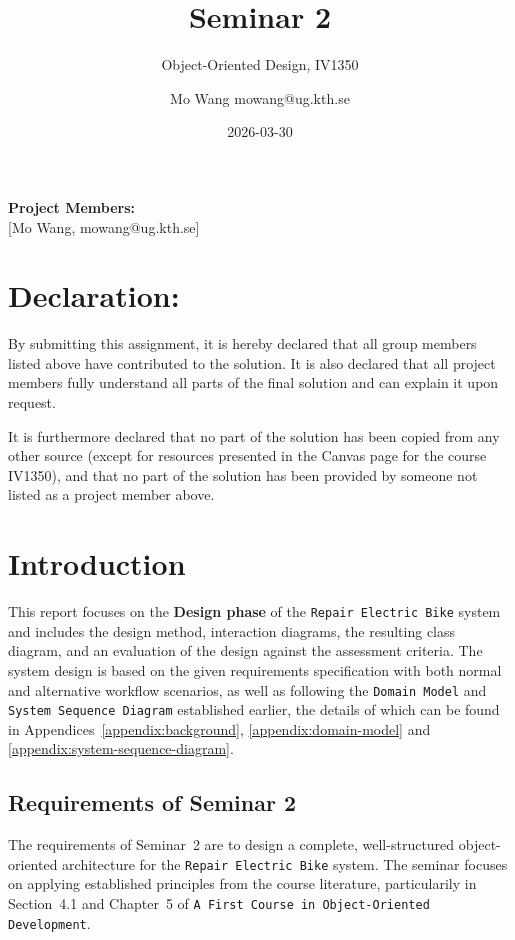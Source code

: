 \documentclass[a4paper]{scrartcl}
\title{Seminar 2}
\subtitle{Object-Oriented Design, IV1350}
\author{Mo Wang mowang@ug.kth.se}
\date{2026-03-30}
\begin{document}
\maketitle
\noindent\textbf{Project Members:} \\ \hfill
[Mo Wang, mowang@ug.kth.se]

\section*{Declaration:}

By submitting this assignment, it is hereby declared that all group members listed above have contributed to the solution. It is also declared that all project members fully understand all parts of the final solution and can explain it upon request.

It is furthermore declared that no part of the solution has been copied from any other source (except for resources presented in the Canvas page for the course IV1350), and that no part of the solution has been provided by someone not listed as a project member above.

\section{Introduction}
\label{sec:intro}


This report focuses on the \textbf{Design phase} of the \texttt{Repair Electric Bike} system and includes the design method, interaction diagrams, the resulting class diagram, and an evaluation of the design against the assessment criteria. The system design is based on the given requirements specification with both normal and alternative workflow scenarios, as well as following the \texttt{Domain Model} and \texttt{System Sequence Diagram} established earlier, the details of which can be found in Appendices~\ref{appendix:background}, \ref{appendix:domain-model} and \ref{appendix:system-sequence-diagram}.

\subsection{Requirements of Seminar 2}
The requirements of Seminar~2 are to design a complete, well-structured object-oriented architecture for the \texttt{Repair Electric Bike} system. The seminar focuses on applying established principles from the course literature, particularily in Section~4.1 and Chapter~5 of \texttt{A First Course in Object-Oriented Development}.
\end{document}
